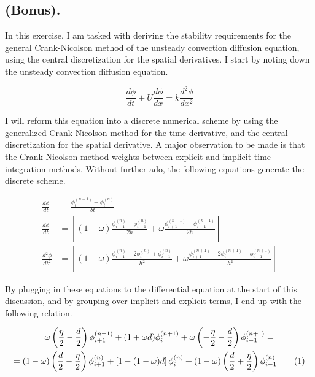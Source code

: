 
\subsection{(Bonus).}
In this exercise, I am tasked with deriving the stability requirements for the general Crank-Nicolson method of the unsteady convection diffusion equation, using the central discretization for the spatial derivatives. I start by noting down the unsteady convection diffusion equation.

\[
	\frac{d \phi}{d t} + U \frac{d \phi}{d x} = k \frac{d^2 \phi}{dx^2}
\]

I will reform this equation into a discrete numerical scheme by using the generalized Crank-Nicolson method for the time derivative, and the central discretization for the spatial derivative. A major observation to be made is that the Crank-Nicolson method weights between explicit and implicit time integration methods. Without further ado, the following equations generate the discrete scheme.

\begin{align*}
	\frac{d \phi}{d t} &= \frac{\phi_{i}^{(n+1)} - \phi_{i}^{(n)}}{\delta t} \\
	\frac{d \phi}{d t} &= \left[ (1-\omega) \frac{\phi_{i+1}^{(n)} - \phi_{i-1}^{(n)}}{2h} + \omega \frac{\phi_{i+1}^{(n+1)} - \phi_{i-1}^{(n+1)}}{2h} \right] \\
	\frac{d^2 \phi}{dt^2} &= \left[ (1-\omega) \frac{\phi_{i+1}^{(n)} - 2 \phi_{i}^{(n)} + \phi_{i-1}^{(n)}}{h^2} + \omega \frac{\phi_{i+1}^{(n+1)} - 2 \phi_{i}^{(n+1)} + \phi_{i-1}^{(n+1)}}{h^2} \right]
\end{align*}

By plugging in these equations to the differential equation at the start of this discussion, and by grouping over implicit and explicit terms, I end up with the following relation.

\begin{gather*} 
	\omega \left( \frac{\eta}{2} - \frac{d}{2} \right) \phi_{i+1}^{(n+1)} + (1 + \omega d) \phi_{i}^{(n+1)} + \omega \left( -\frac{\eta}{2} -\frac{d}{2} \right) \phi_{i-1}^{(n+1)} = \\
	= ( 1 - \omega ) \left( \frac{d}{2} - \frac{\eta}{2} \right) \phi_{i+1}^{(n)} + \left[ 1 - (1 - \omega)d \right] \phi_{i}^{(n)} + (1-\omega) \left( \frac{d}{2} + \frac{\eta}{2} \right) \phi_{i-1}^{(n)} \numberthis \label{eq: bonus}
\end{gather*}


